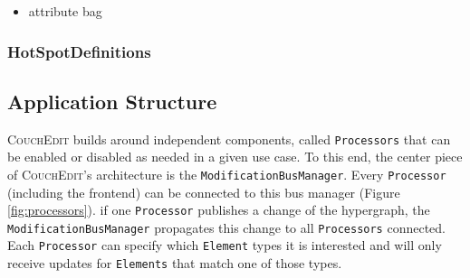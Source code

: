 \begin{itemize}
  \item attribute bag
\end{itemize}

\subsubsection{HotSpotDefinitions}


\subsection{Application Structure}
\textsc{CouchEdit} builds around independent components, called \texttt{Processors} that can be enabled or disabled as needed in a given use case. To this end, the center piece of \textsc{CouchEdit}'s architecture is the \texttt{ModificationBusManager}. Every \texttt{Processor} (including the frontend) can be connected to this bus manager (Figure \ref{fig:processors}). if one \texttt{Processor} publishes a change of the hypergraph, the \texttt{ModificationBusManager} propagates this change to all \texttt{Processors} connected. Each \texttt{Processor} can specify which \texttt{Element} types it is interested and will only receive updates for \texttt{Elements} that match one of those types. 



